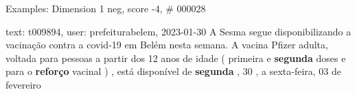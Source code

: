 \begin{frame}{Examples: Dimension 1 neg, score -4, \# 000028}
\footnotesize
\begin{alertblock}{text: t009894, user: prefeiturabelem, 2023-01-30}
A Sesma segue disponibilizando a vacinação contra a covid-19 em Belém nesta 
semana. A vacina Pfizer adulta, voltada para pessoas a partir dos 12 anos de 
idade ( primeira e \textbf{segunda} doses e para o \textbf{reforço} vacinal ) , 
está disponível de \textbf{segunda} , 30 , a sexta-feira, 03 de fevereiro 
\end{alertblock}
\end{frame}
